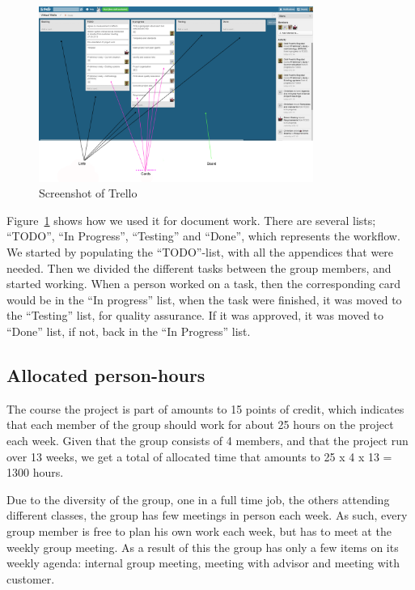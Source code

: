 \documentclass[11pt]{book}
\begin{document}
\begin{figure}[H]
      \centering
      \includegraphics[width=0.8\textwidth]{Figures/trello.png}
      \caption{Screenshot of Trello}
      \label{fig:tools_trello}
\end{figure}

Figure~\ref{fig:tools_trello} shows how we used it for document work. There are several lists; ``TODO'', ``In Progress'', ``Testing'' and ``Done'', which represents the workflow. We started by populating the ``TODO''-list, with all the appendices that were needed. Then we divided the different tasks between the group members, and started working. When a person worked on a task, then the corresponding card would be in the ``In progress'' list, when the task were finished, it was moved to the ``Testing'' list, for quality assurance. If it was approved, it was moved to ``Done'' list, if not, back in the ``In Progress'' list.

\subsection{Allocated person-hours}
The course the project is part of amounts to 15 points of credit, which indicates that each member of the group should work for about 25 hours on the project each week. Given that the group consists of 4 members, and that the project run over 13 weeks, we get a total of allocated time that amounts to 25 x 4 x 13 = 1300 hours.

Due to the diversity of the group, one in a full time job, the others attending different classes, the group has few meetings in person each week. As such, every group member is free to plan his own work each week, but has to meet at the weekly group meeting. As a result of this the group has only a few items on its weekly agenda: internal group meeting, meeting with advisor and meeting with customer.
\end{document}
